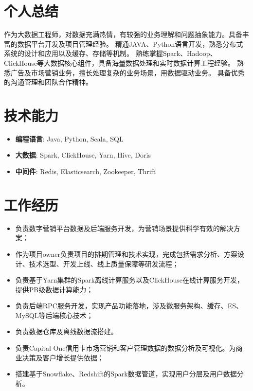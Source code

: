 \documentclass{resume}
\begin{document}

 
\section{个人总结}
作为大数据工程师，对数据充满热情，有较强的业务理解和问题抽象能力。具备丰富的数据平台开发及项目管理经验。
精通JAVA、Python语言开发，熟悉分布式系统的设计和应用以及缓存、存储等机制。
熟练掌握Spark、Hadoop、ClickHouse等大数据核心组件，具备海量数据处理和实时数据计算工程经验。
熟悉广告及市场营销业务，擅长处理复杂的业务场景，用数据驱动业务。
具备优秀的沟通管理和团队合作精神。

\section{技术能力}
\begin{itemize}[parsep=0.2ex]
  \item \textbf{编程语言}: Java, Python, Scala, SQL
  \item \textbf{大数据}: Spark, ClickHouse, Yarn, Hive, Doris
  \item \textbf{中间件}: Redis, Elasticsearch, Zookeeper, Thrift
\end{itemize}

\section{工作经历}
\begin{itemize}
  \item 负责数字营销平台数据及后端服务开发，为营销场景提供科学有效的解决方案；
  \item 作为项目owner负责项目的排期管理和技术实现，完成包括需求分析、方案设计、技术选型、开发上线、线上质量保障等研发流程；
  \item 负责基于Yarn集群的Spark离线计算服务以及ClickHouse在线计算服务开发，提供PB级数据计算能力；
  \item 负责后端RPC服务开发，实现产品功能落地，涉及微服务架构、缓存、ES、MySQL等后端核心技术；
  \item 负责数据仓库及离线数据流搭建。
\end{itemize}

\begin{itemize}
  \item 负责Capital One信用卡市场营销和客户管理数据的数据分析及可视化。为商业决策及客户增长提供依据；
  \item 搭建基于Snowflake、Redshift的Spark数据管道，实现用户分层及用户数据分析。
\end{itemize}
\end{document}

